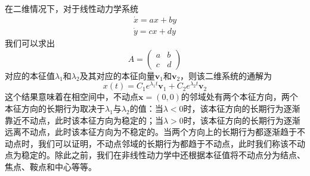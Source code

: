 在二维情况下，对于线性动力学系统
\begin{equation}
    \begin{aligned}
        \dot{x}=ax+by\\
        \dot{y}=cx+dy
    \end{aligned}
\end{equation}
我们可以求出
\begin{equation}
    A=\begin{pmatrix}
        a & b \\
        c & d
    \end{pmatrix}
\end{equation}
对应的本征值$\lambda_1$和$\lambda_2$及其对应的本征向量$\mathbf{v}_1$和$\mathbf{v}_2$，则该二维系统的通解为
\begin{equation}
    x(t)=C_1e^{\lambda_1t}\mathbf{v}_1+C_2e^{\lambda_2t}\mathbf{v}_2
\end{equation}
这个结果意味着在相空间中，不动点$\mathbf{x}=(0,0)$的邻域处有两个本征方向，两个本征方向的长期行为取决于$\lambda_1$与$\lambda_2$的值：当$\lambda<0$时，该本征方向的长期行为逐渐靠近不动点，此时该本征方向为稳定的；当$\lambda>0$时，该本征方向的长期行为逐渐远离不动点，此时该本征方向为不稳定的。当两个方向上的长期行为都逐渐趋于不动点时，我们可以证明\cite{strogatz2001nonlinear}，不动点邻域的长期行为都趋于不动点，此时我们称该不动点为稳定的。除此之前，我们在非线性动力学中还根据本征值将不动点分为结点、焦点、鞍点和中心等等。

